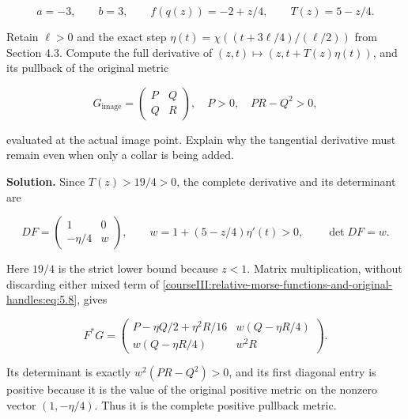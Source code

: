 \begin{equation}
a=-3,\qquad b=3,\qquad f(q(z))=-2+z/4,\qquad
T(z)=5-z/4.
\label{courseIII:relative-morse-functions-and-original-handles:eq:5.7}
\end{equation}

Retain \(\ell>0\) and the exact step
\(\eta(t)=\chi((t+3\ell/4)/(\ell/2))\) from Section 4.3. Compute the full derivative of \((z,t)\mapsto(z,t+T(z)\eta(t))\), and its pullback of the original metric

\begin{equation}
G_{\mathrm{image}}=
\begin{pmatrix}P&Q\\Q&R\end{pmatrix},
\quad P>0,\quad PR-Q^2>0,
\label{courseIII:relative-morse-functions-and-original-handles:eq:5.8}
\end{equation}

evaluated at the actual image point. Explain why the tangential derivative must remain even when only a collar is being added.

\textbf{Solution.} Since \(T(z)>19/4>0\), the complete derivative and its determinant are

\begin{equation}
D F=
\begin{pmatrix}
1&0\\-\eta/4&w
\end{pmatrix},
\qquad
w=1+(5-z/4)\eta'(t)>0,\qquad
\det DF=w.
\label{courseIII:relative-morse-functions-and-original-handles:eq:5.9}
\end{equation}

Here \(19/4\) is the strict lower bound because \(z<1\). Matrix multiplication, without discarding either mixed term of \eqref{courseIII:relative-morse-functions-and-original-handles:eq:5.8}, gives

\begin{equation}
F^*G=
\begin{pmatrix}
P-\eta Q/2+\eta^2R/16 & w(Q-\eta R/4)\\
w(Q-\eta R/4)&w^2R
\end{pmatrix}.
\label{courseIII:relative-morse-functions-and-original-handles:eq:5.10}
\end{equation}

Its determinant is exactly \(w^2(PR-Q^2)>0\), and its first diagonal entry is positive because it is the value of the original positive metric on the nonzero vector \((1,-\eta/4)\). Thus it is the complete positive pullback metric.

